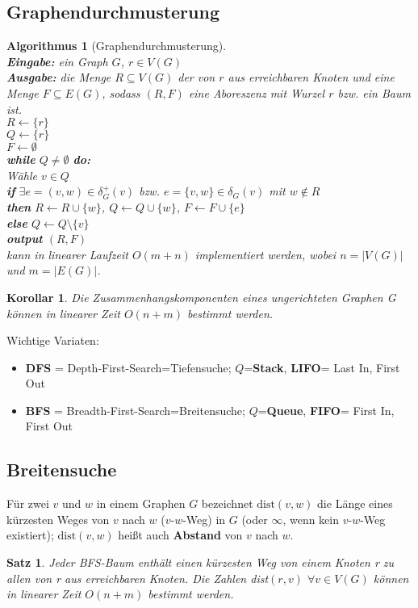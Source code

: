 \documentclass[12pt,a4paper]{article}
\theoremstyle{plain}
\newtheorem{Satz}[Theorem]{Satz}
\newtheorem{Korollar}[Theorem]{Korollar}
\newtheorem{Algorithmus}[Theorem]{Algorithmus}
\numberwithin{equation}{section}
\begin{document}
\subsection{Graphendurchmusterung}
\begin{Algorithmus}[Graphendurchmusterung]\\
\textbf{Eingabe:} ein Graph $G$, $r\in V(G)$\\
\textbf{Ausgabe:} die Menge $R\subseteq V(G)$ der von $r$ aus erreichbaren Knoten und eine Menge $F\subseteq E(G)$, sodass $(R,F)$ eine Aboreszenz mit Wurzel $r$ bzw. ein Baum ist.\\
$R\leftarrow \{r\}$\\
$Q\leftarrow \{r\}$\\
$F\leftarrow \emptyset$\\
\textbf{while} $Q \neq \emptyset$ \textbf{do:}\\
\text{\qquad} Wähle $v\in Q$\\
\text{\qquad} \textbf{if} $\exists e=(v,w)\in \delta^+_G(v)$ bzw. $e=\{v,w\}\in \delta_G(v)$ mit $w \not\in R$\\
\text{\qquad} \textbf{then} $R\leftarrow R\cup \{w\}$, $Q\leftarrow Q\cup \{w\}$, $F\leftarrow F\cup\{e\}$\\
\text{\qquad} \textbf{else} $Q\leftarrow Q\setminus\{v\}$\\
\textbf{output} $(R,F)$\\
kann in linearer Laufzeit $O(m+n)$ implementiert werden, wobei $n=|V(G)|$ und $m=|E(G)|$. 
\end{Algorithmus}
\begin{Korollar}
Die Zusammenhangskomponenten eines ungerichteten Graphen G können in linearer Zeit $O(n+m)$ bestimmt werden.
\end{Korollar}
Wichtige Variaten:
\begin{itemize}
\item \textbf{DFS} = Depth-First-Search=Tiefensuche; $Q$=\textbf{Stack}, \textbf{LIFO}= Last In, First Out
\item \textbf{BFS} = Breadth-First-Search=Breitensuche; $Q$=\textbf{Queue}, \textbf{FIFO}= First In, First Out
\end{itemize}
\subsection{Breitensuche}
Für zwei $v$ und $w$ in einem Graphen $G$ bezeichnet $\text{dist}(v,w)$ die Länge eines kürzesten Weges von $v$ nach $w$ ($v$-$w$-Weg) in $G$ (oder $\infty$, wenn kein $v$-$w$-Weg existiert); $\text{dist}(v,w)$ heißt auch \textbf{Abstand} von $v$ nach $w$.
\begin{Satz}
Jeder BFS-Baum enthält einen kürzesten Weg von einem Knoten r zu allen von r aus erreichbaren Knoten. Die Zahlen \emph{dist}$(r,v)$ $\forall v\in V(G)$ können in linearer Zeit $O(n+m)$ bestimmt werden.
\end{Satz}
\end{document}
